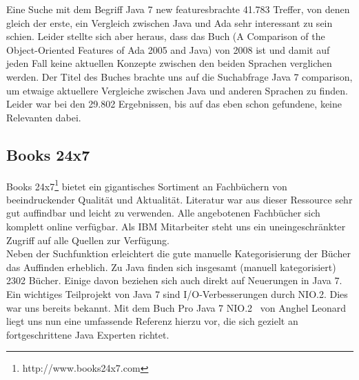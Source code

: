 Eine Suche mit dem Begriff \glqq Java 7 new features\grqq brachte 41.783 Treffer, von denen gleich der erste, ein Vergleich zwischen
Java und Ada sehr interessant zu sein schien. Leider stellte sich aber heraus, dass das Buch 
(\glqq A Comparison of the Object-Oriented Features of Ada 2005 and Java\grqq\cite{adacomparison}) von 2008 ist 
und damit auf jeden Fall keine aktuellen Konzepte zwischen den beiden Sprachen verglichen werden.
Der Titel des Buches brachte uns auf die Suchabfrage \glqq Java 7 comparison\grqq, um etwaige aktuellere Vergleiche zwischen
Java und anderen Sprachen zu finden. Leider war bei den 29.802 Ergebnissen, bis auf das eben schon gefundene, keine Relevanten
dabei.

%

\subsection{Books 24x7}
Books 24x7\footnote{http://www.books24x7.com} bietet ein gigantisches Sortiment an Fachbüchern von beeindruckender Qualität und Aktualität. Literatur war aus dieser Ressource sehr gut auffindbar und leicht zu verwenden. Alle angebotenen Fachbücher sich komplett online verfügbar. Als IBM Mitarbeiter steht uns ein uneingeschränkter Zugriff auf alle Quellen zur Verfügung.\\

Neben der Suchfunktion erleichtert die gute manuelle Kategorisierung der Bücher das Auffinden erheblich. Zu Java finden sich insgesamt (manuell kategorisiert) 2302 Bücher. Einige davon beziehen sich auch direkt auf Neuerungen in Java 7.\\

Ein wichtiges Teilprojekt von Java 7 sind I/O-Verbesserungen durch NIO.2. Dies war uns bereits bekannt. Mit dem Buch \glqq Pro Java 7 NIO.2\grqq\cite{b247nio2} ~von Anghel Leonard liegt uns nun eine umfassende Referenz hierzu vor, die sich gezielt an fortgeschrittene Java Experten richtet.

